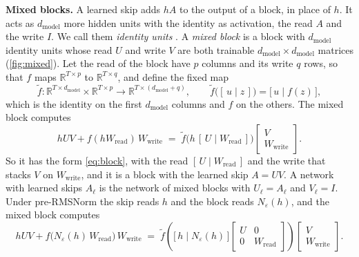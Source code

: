 \documentclass[10pt]{article}
\theoremstyle{definition}
\theoremstyle{remark}
\newcommand{\R}{\mathbb{R}}
\newcommand{\Wread}{W_{\mathrm{read}}}
\newcommand{\Wwrite}{W_{\mathrm{write}}}
\newcommand{\dm}{d_{\mathrm{model}}}
\newcommand{\para}[1]{\smallskip\noindent\textbf{#1}\hspace{0.5em}}
\begin{document}
\para{Mixed blocks.} A learned skip adds $hA$ to the output of a block, in place of $h$. It acts as $\dm$ more hidden units with the identity as activation, the read $A$ and the write $I$. We call them \emph{identity units} \citep[Section~4]{lin2018resnet}. A \emph{mixed block} is a block with $\dm$ identity units whose read $U$ and write $V$ are both trainable $\dm\times\dm$ matrices (\cref{fig:mixed}). Let the read of the block have $p$ columns and its write $q$ rows, so that $f$ maps $\R^{T\times p}$ to $\R^{T\times q}$, and define the fixed map
\[
\tilde f : \R^{T\times\dm} \times \R^{T\times p} \to \R^{T\times(\dm+q)}, \qquad \tilde f\big([\,u \mid z\,]\big) = \big[\,u \mid f(z)\,\big],
\]
which is the identity on the first $\dm$ columns and $f$ on the others. The mixed block computes
\begin{equation}\label{eq:mixed}
hUV + f(h\Wread)\,\Wwrite \;=\; \tilde f\big(h\,[\,U \mid \Wread\,]\big)\begin{bmatrix} V \\ \Wwrite \end{bmatrix}.
\end{equation}
So it has the form \eqref{eq:block}, with the read $[\,U \mid \Wread\,]$ and the write that stacks $V$ on $\Wwrite$, and it is a block with the learned skip $A = UV$. A network with learned skips $A_\ell$ is the network of mixed blocks with $U_\ell = A_\ell$ and $V_\ell = I$. Under pre-RMSNorm the skip reads $h$ and the block reads $N_\varepsilon(h)$, and the mixed block computes
\begin{equation}\label{eq:prenormblock}
hUV + f\big(N_\varepsilon(h)\,\Wread\big)\,\Wwrite \;=\; \tilde f\left(\big[\,h \mid N_\varepsilon(h)\,\big]\begin{bmatrix} U & 0 \\ 0 & \Wread \end{bmatrix}\right)\begin{bmatrix} V \\ \Wwrite \end{bmatrix}.
\end{equation}
\end{document}
